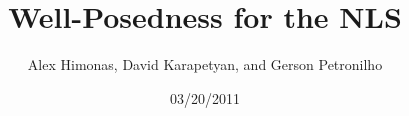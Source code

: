 \documentclass[12pt,reqno]{amsart}
\numberwithin{equation}{section}  %
\begin{document}
\title{Well-Posedness for the NLS}
\author{Alex Himonas, David Karapetyan, and Gerson Petronilho}
\address{Department of Mathematics  \\
University  of Notre Dame\\
Notre Dame, IN 46556 }
\address{Department of Mathematics \\
University  of Notre Dame\\
Notre Dame, IN 46556 }
\address{Departamento de Matemática \\
Universidade Federal de São
Carlos \\
Rodovia Washington Luiz, Km 235, São Carlos, SP,
13565-905, Brasil}
        \date{03/20/2011}
        \maketitle
\end{document}
